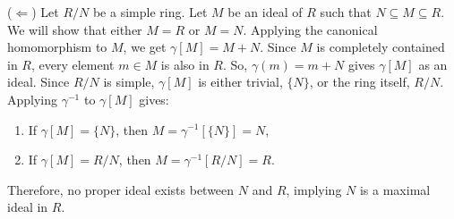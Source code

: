 \documentclass[12pt, oneside]{book}
\begin{document}
\begin{enumerate}
{		(\(\Leftarrow\)) Let \(R/N\) be a simple ring. Let \(M\) be an ideal of \(R\) such that \(N \subseteq M \subseteq R\). We will show that either \(M = R\) or \(M = N\). Applying the canonical homomorphism to \(M\), we get \(\gamma[M] = M + N\). Since \(M\) is completely contained in \(R\), every element \(m \in M\) is also in \(R\). So, \(\gamma(m) = m + N\) gives \(\gamma[M]\) as an ideal. Since \(R/N\) is simple, \(\gamma[M]\) is either trivial, \(\{N\}\), or the ring itself, \(R/N\). Applying \(\gamma^{-1}\) to \(\gamma[M]\) gives:
		\begin{enumerate}[label=(\arabic*)]
			\item If \(\gamma[M] = \{N\}\), then \(M = \gamma^{-1}[\{N\}] = N\),
			\item If \(\gamma[M] = R/N\), then \(M = \gamma^{-1}[R/N] = R\). 
		\end{enumerate}
		Therefore, no proper ideal exists between \(N\) and \(R\), implying \(N\) is a maximal ideal in \(R\). 
	}

	\newpage


\end{enumerate}
\end{document}
